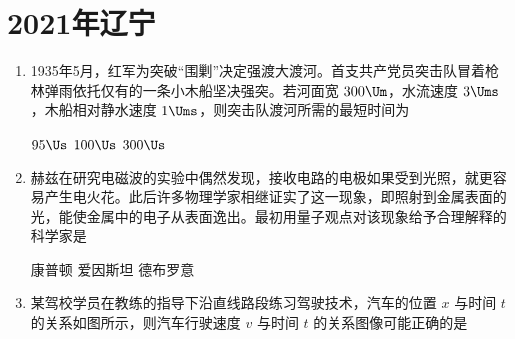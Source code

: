\documentclass[\gkver]{gaokaozhenti}
\begin{document}
\chapter{2021年辽宁}

\begin{enumerate}
\item
1935年5月，红军为突破“围剿”决定强渡大渡河。首支共产党员突击队冒着枪林弹雨依托仅有的一条小木船坚决强突。若河面宽 $300\Um$，水流速度 $3\Ums$，木船相对静水速度 $1\Ums$，则突击队渡河所需的最短时间为

\fourchoices[answer=D]
{$75\Us$}
{$95\Us$}
{$100\Us$}
{$300\Us$}


\item
赫兹在研究电磁波的实验中偶然发现，接收电路的电极如果受到光照，就更容易产生电火花。此后许多物理学家相继证实了这一现象，即照射到金属表面的光，能使金属中的电子从表面逸出。最初用量子观点对该现象给予合理解释的科学家是

{康普顿}
{爱因斯坦}
{德布罗意}


\item
某驾校学员在教练的指导下沿直线路段练习驾驶技术，汽车的位置 $x$ 与时间 $t$ 的关系如图所示，则汽车行驶速度 $v$ 与时间 $t$ 的关系图像可能正确的是


\end{enumerate}
\end{document}

